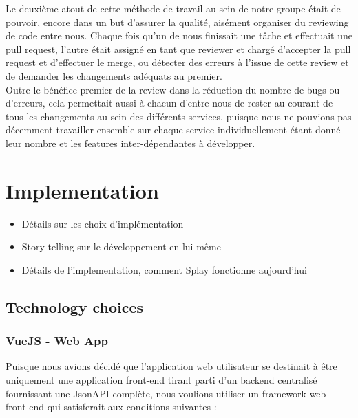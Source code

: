 \documentclass{eplmastersthesis}
\begin{document}
        Le deuxième atout de cette méthode de travail au sein de notre groupe
        était de pouvoir, encore dans un but d'assurer la qualité, aisément
        organiser du reviewing de code entre nous. Chaque fois qu'un de nous
        finissait une tâche et effectuait une pull request, l'autre était
        assigné en tant que reviewer et chargé d'accepter la pull request
        et d'effectuer le merge, ou détecter des erreurs à l'issue de cette
        review et de demander les changements adéquats au premier.\\
        Outre le bénéfice premier de la review dans la réduction du nombre
        de bugs ou d'erreurs, cela permettait aussi à chacun d'entre nous
        de rester au courant de tous les changements au sein des différents
        services, puisque nous ne pouvions pas décemment travailler ensemble
        sur chaque service individuellement étant donné leur nombre et les
        features inter-dépendantes à développer.


  \chapter{Implementation}

    \begin{itemize}
      \item Détails sur les choix d'implémentation
      \item Story-telling sur le développement en lui-même
      \item Détails de l'implementation, comment Splay fonctionne aujourd'hui
    \end{itemize}

    \section{Technology choices}

      \subsection{VueJS - Web App}

        Puisque nous avions décidé que l'application web utilisateur se
        destinait à être uniquement une application front-end tirant
        parti d'un backend centralisé fournissant une JsonAPI complète, nous
        voulions utiliser un framework web front-end qui satisferait aux
        conditions suivantes : \\
\end{document}
